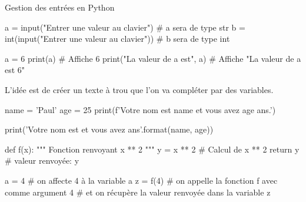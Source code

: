 \def\level{Première}  %
\def\course{NSI}
\def\chaptername{Les Fonctions} %
\def\docname{AP02-S}        %

\pagestyle{cours_FP}
\makeheader{} %

\begin{easybox}{Gestion des entrées en Python}
    \begin{CodePythontexAlt}[Largeur=17cm,Centre,PremLigne=1,Lignes=false,]{}
        a = input("Entrer une valeur au clavier")           # a sera de type str
        b = int(input("Entrer une valeur au clavier"))      # b sera de type int
    \end{CodePythontexAlt}

    \begin{CodePythontexAlt}[Largeur=17cm,Centre,PremLigne=1,Lignes=false,]{}
         a = 6
         print(a)  # Affiche 6
         print("La valeur de a est", a)  # Affiche "La valeur de a est 6"   
      \end{CodePythontexAlt}
\end{easybox}	

\begin{methode}{}

    L'idée est de créer un texte à trou que l'on va compléter par des variables.
\begin{ConsolePythontex}[Label=false]{}
    name = 'Paul'
    age = 25
    print(f'Votre nom est {name} et vous avez {age} ans.')
\end{ConsolePythontex}  

\begin{ConsolePythontex}[Label=false]{}
    print('Votre nom est {} et vous avez {} ans'.format(name, age))
\end{ConsolePythontex}
\end{methode}


\begin{definition}{}

	\begin{CodePythontexAlt}[Centre,PremLigne=1]{}
		def f(x):
			""" Fonction renvoyant x ** 2 """
			y = x ** 2		# Calcul de x ** 2
			return y  		# valeur renvoyée: y
		\end{CodePythontexAlt}
		
   \end{definition}

		\begin{CodePythontexAlt}[Centre,PremLigne=1, Lignes=false,]{}
			a = 4   		# on affecte 4 à la variable a
			z = f(4)		# on appelle la fonction f avec comme argument 4 
							# et on récupère la valeur renvoyée dans la variable z
		\end{CodePythontexAlt}

